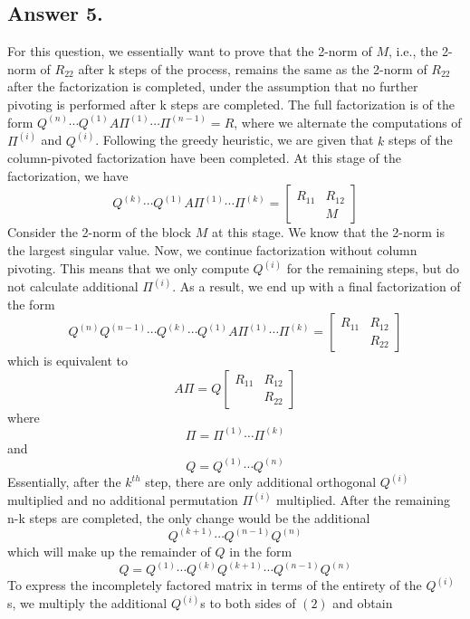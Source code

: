 \documentclass[12pt]{article}
\begin{document}
\subsection*{Answer 5.}
For this question, we essentially want to prove that the 2-norm of $M$, i.e., the 2-norm of $R_{22}$ after k steps of the process, remains the same as the 2-norm of $R_{22}$ after the factorization is completed, under the assumption that no further pivoting is performed after k steps are completed. The full factorization is of the form $Q^{(n)} \cdots Q^{(1)} A \Pi^{(1)} \cdots \Pi^{(n-1)} = R$, where we alternate the computations of ${\Pi}^{(i)}$ and $Q^{(i)}$.
Following the greedy heuristic, we are given that $k$ steps of the column-pivoted factorization have been completed. At this stage of the factorization, we have \begin{equation*}
    Q^{(k)}\cdots Q^{(1)}A\Pi^{(1)}\cdots\Pi^{(k)} = \begin{bmatrix} R_{11} & R_{12} \\ & M\end{bmatrix}
\end{equation*}
Consider the 2-norm of the block $M$ at this stage. We know that the 2-norm is the largest singular value. 
Now, we continue factorization without column pivoting. This means that we only compute $Q^{(i)}$ for the remaining steps, but do not calculate additional ${\Pi}^{(i)}$. 
As a result, we end up with a final factorization of the form 
\begin{equation*}
    Q^{(n)}Q^{(n-1)}\cdots Q^{(k)}\cdots Q^{(1)}A\Pi^{(1)}\cdots\Pi^{(k)} = \begin{bmatrix} R_{11} & R_{12} \\ & R_{22}\end{bmatrix}
\end{equation*}
which is equivalent to 
\[ A\Pi = Q \begin{bmatrix} R_{11} & R_{12} \\ & R_{22}\end{bmatrix}\]
where \[\Pi = \Pi^{(1)}\cdots\Pi^{(k)}\] and \[Q = Q^{(1)} \cdots Q^{(n)}\]
Essentially, after the $k^{th}$ step, there are only additional orthogonal $Q^{(i)}$ multiplied and no additional permutation ${\Pi}^{(i)}$ multiplied.
After the remaining n-k steps are completed, the only change would be the additional \[ Q^{(k+1)} \cdots Q^{(n-1)}Q^{(n)}\] which will make up the remainder of $Q$ in the form \[Q = Q^{(1)} \cdots Q^{(k)}Q^{(k+1)} \cdots Q^{(n-1)}Q^{(n)}\]
To express the incompletely factored matrix in terms of the entirety of the $Q^{(i)}$s, we multiply the additional $Q^{(i)}$s to both sides of $(2)$ and obtain 
\end{document}
